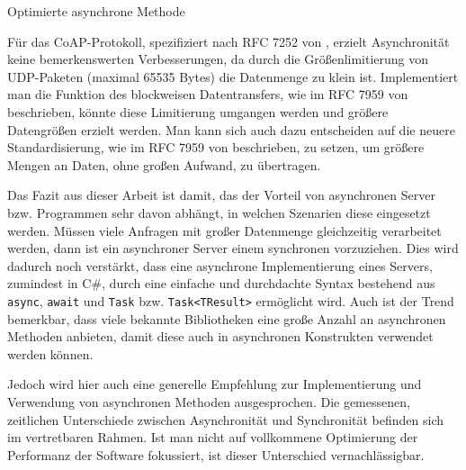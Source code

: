 \begin{listing}[h]
    \inputminted[framesep=2mm, baselinestretch=1.2, fontsize=\normalsize, linenos]{csharp}{codes/example_async_method.cs}
    \caption{Optimierte asynchrone Methode}
    \label{listing:optimierte-asynchrone-methode}
\end{listing}

Für das CoAP-Protokoll, spezifiziert nach RFC 7252 von \citeauthor{RFC7252}, erzielt Asynchronität keine bemerkenswerten Verbesserungen, da durch die Größenlimitierung von UDP-Paketen (maximal 65535 Bytes) die Datenmenge zu klein ist. Implementiert man die Funktion des blockweisen Datentransfers, wie im RFC 7959 von \citeauthor{RFC7959} beschrieben, könnte diese Limitierung umgangen werden und größere Datengrößen erzielt werden. Man kann sich auch dazu entscheiden auf die neuere Standardisierung, wie im RFC 7959 von \citeauthor{RFC7959} beschrieben, zu setzen, um größere Mengen an Daten, ohne großen Aufwand, zu übertragen.

Das Fazit aus dieser Arbeit ist damit, das der Vorteil von asynchronen Server bzw. Programmen sehr davon abhängt, in welchen Szenarien diese eingesetzt werden. Müssen viele Anfragen mit großer Datenmenge gleichzeitig verarbeitet werden, dann ist ein asynchroner Server einem synchronen vorzuziehen. Dies wird dadurch noch verstärkt, dass eine asynchrone Implementierung eines Servers, zumindest in C\#, durch eine einfache und durchdachte Syntax bestehend aus \texttt{async}, \texttt{await} und \texttt{Task} bzw. \texttt{Task<TResult>} ermöglicht wird. Auch ist der Trend bemerkbar, dass viele bekannte Bibliotheken eine große Anzahl an asynchronen Methoden anbieten, damit diese auch in asynchronen Konstrukten verwendet werden können.

Jedoch wird hier auch eine generelle Empfehlung zur Implementierung und Verwendung von asynchronen Methoden ausgesprochen. Die gemessenen, zeitlichen Unterschiede zwischen Asynchronität und Synchronität befinden sich im vertretbaren Rahmen. Ist man nicht auf vollkommene Optimierung der Performanz der Software fokussiert, ist dieser Unterschied vernachlässigbar.